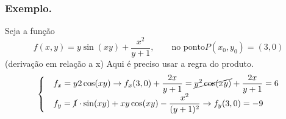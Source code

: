 \subsubsection{Exemplo.}
Seja a função 
\[f(x,y)=y\sin(xy)+\frac{x^2}{y+1},\qquad\text{no ponto} P(x_0,y_0)=(3,0)\]
(derivação em relação a x)
Aqui é preciso usar a regra do produto.
\[ \begin{cases}
  &f_x=y2\cos(xy)\to f_x(3,0)+\dfrac{2x}{y+1}=\cancel{y^2\cos(xy)}
  +\dfrac{2x}{y+1}=6\\
  &f_y=\cancel{1}\cdot\sin(xy)+xy\cos(xy)-\dfrac{x^2}{(y+1)^2}\to f_y(3,0)=-9

\end{cases} \]